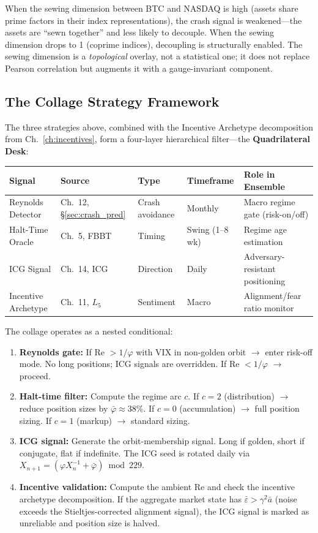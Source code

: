 When the sewing dimension between BTC and NASDAQ is high (assets share prime factors in their index representations), the crash signal is weakened---the assets are ``sewn together'' and less likely to decouple. When the sewing dimension drops to 1 (coprime indices), decoupling is structurally enabled. The sewing dimension is a \emph{topological} overlay, not a statistical one; it does not replace Pearson correlation but augments it with a gauge-invariant component.

\subsection{The Collage Strategy Framework}\label{sec:collage}

The three strategies above, combined with the Incentive Archetype decomposition from Ch.~\ref{ch:incentives}, form a four-layer hierarchical filter---the \textbf{Quadrilateral Desk}:

\begin{center}\small
\begin{tabular}{@{}p{3cm}p{2.5cm}p{2cm}p{2.5cm}p{3.5cm}@{}}
\toprule
\textbf{Signal} & \textbf{Source} & \textbf{Type} & \textbf{Timeframe} & \textbf{Role in Ensemble} \\
\midrule
Reynolds Detector & Ch.~12, \S\ref{sec:crash_pred} & Crash avoidance & Monthly & Macro regime gate (risk-on/off) \\
Halt-Time Oracle & Ch.~5, FBBT & Timing & Swing (1--8 wk) & Regime age estimation \\
ICG Signal & Ch.~14, ICG & Direction & Daily & Adversary-resistant positioning \\
Incentive Archetype & Ch.~11, $L_5$ & Sentiment & Macro & Alignment/fear ratio monitor \\
\bottomrule
\end{tabular}
\end{center}

The collage operates as a nested conditional:

\begin{enumerate}[noitemsep]
\item \textbf{Reynolds gate:} If Re $> 1/\varphi$ with VIX in non-golden orbit $\to$ enter risk-off mode. No long positions; ICG signals are overridden. If Re $< 1/\varphi$ $\to$ proceed.
\item \textbf{Halt-time filter:} Compute the regime arc $c$. If $c = 2$ (distribution) $\to$ reduce position sizes by $\bar\varphi \approx 38\%$. If $c = 0$ (accumulation) $\to$ full position sizing. If $c = 1$ (markup) $\to$ standard sizing.
\item \textbf{ICG signal:} Generate the orbit-membership signal. Long if golden, short if conjugate, flat if indefinite. The ICG seed is rotated daily via $X_{n+1} = (\varphi X_n^{-1} + \bar\varphi) \bmod 229$.
\item \textbf{Incentive validation:} Compute the ambient Re and check the incentive archetype decomposition. If the aggregate market state has $\bar\varepsilon > \gamma^2 \bar{a}$ (noise exceeds the Stieltjes-corrected alignment signal), the ICG signal is marked as unreliable and position size is halved.
\end{enumerate}

